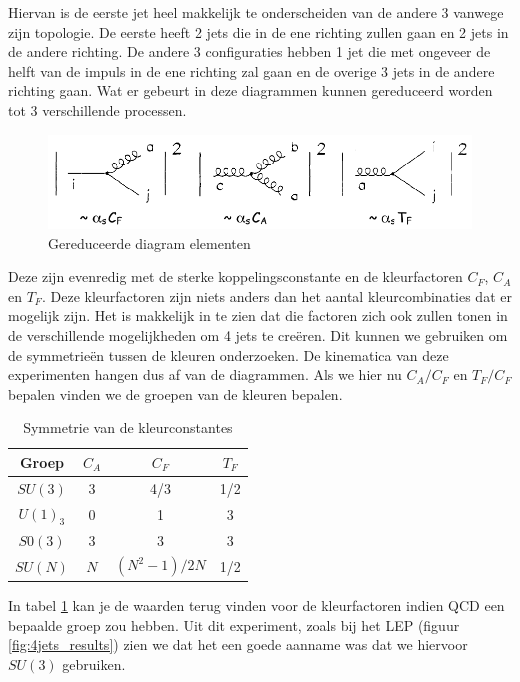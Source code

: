 \documentclass[../main.tex]{subfiles}
\begin{document}
Hiervan is de eerste jet heel makkelijk te onderscheiden van de andere 3 vanwege zijn topologie. De eerste heeft 2 jets die in de ene richting zullen gaan en 2 jets in de andere richting. De andere 3 configuraties hebben 1 jet die met ongeveer de helft van de impuls in de ene richting zal gaan en de overige 3 jets in de andere richting gaan. Wat er gebeurt in deze diagrammen kunnen gereduceerd worden tot 3 verschillende processen.

\begin{figure}[h]
    \centering
    \includegraphics[width=0.8\linewidth]{QCD/reduced_events.png}
    \caption{Gereduceerde diagram elementen}%
    \label{fig:reduced_events}
\end{figure}

Deze zijn evenredig met de sterke koppelingsconstante en de kleurfactoren $C_F$, $C_A$ en $T_F$. Deze kleurfactoren zijn niets anders dan het aantal kleurcombinaties dat er mogelijk zijn. Het is makkelijk in te zien dat die factoren zich ook zullen tonen in de verschillende mogelijkheden om 4 jets te creëren. Dit kunnen we gebruiken om de symmetrieën tussen de kleuren onderzoeken. De kinematica van deze experimenten hangen dus af van de diagrammen. Als we hier nu $C_A/C_F$ en $T_F/C_F$ bepalen vinden we de groepen van de kleuren bepalen.

\begin{table}[h]
    \centering
    \caption{Symmetrie van de kleurconstantes}
    \label{tab:sym_kleurfact}
    \begin{tabular}{|c|c|c|c|}
        \hline
        Groep   & $C_A$ & $C_F$         & $T_F$ \\
        \hline
        $SU(3)$ & 3     & 4/3           & 1/2   \\
        $U(1)_3$& 0     & 1             & 3     \\
        $S0(3)$ & 3     & 3             & 3     \\
        $SU(N)$ & $N$   & $(N^2-1)/2N$  & 1/2   \\
        \hline
    \end{tabular}
\end{table}

In tabel \ref{tab:sym_kleurfact} kan je de waarden terug vinden voor de kleurfactoren indien QCD een bepaalde groep zou hebben. Uit dit experiment, zoals bij het LEP (figuur \ref{fig:4jets_results}) zien we dat het een goede aanname was dat we hiervoor $SU(3)$ gebruiken.
\end{document}
